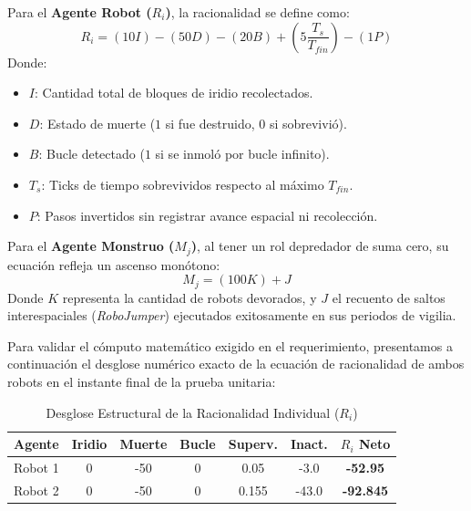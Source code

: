 \documentclass[conference]{IEEEtran}
\begin{document}
Para el \textbf{Agente Robot ($R_i$)}, la racionalidad se define como:
\begin{equation}
R_i = (10 I) - (50 D) - (20 B) + \left(5 \frac{T_s}{T_{fin}}\right) - (1 P)
\end{equation}
Donde:
\begin{itemize}
    \item $I$: Cantidad total de bloques de iridio recolectados.
    \item $D$: Estado de muerte ($1$ si fue destruido, $0$ si sobrevivió).
    \item $B$: Bucle detectado ($1$ si se inmoló por bucle infinito).
    \item $T_s$: Ticks de tiempo sobrevividos respecto al máximo $T_{fin}$.
    \item $P$: Pasos invertidos sin registrar avance espacial ni recolección.
\end{itemize}

Para el \textbf{Agente Monstruo ($M_j$)}, al tener un rol depredador de suma cero, su ecuación refleja un ascenso monótono:
\begin{equation}
M_j = (100 K) + J
\end{equation}
Donde $K$ representa la cantidad de robots devorados, y $J$ el recuento de saltos interespaciales (\textit{RoboJumper}) ejecutados exitosamente en sus periodos de vigilia.

Para validar el cómputo matemático exigido en el requerimiento, presentamos a continuación el desglose numérico exacto de la ecuación de racionalidad de ambos robots en el instante final de la prueba unitaria:

\begin{table}[htbp]
\caption{Desglose Estructural de la Racionalidad Individual ($R_i$)}
\begin{center}
\begin{tabular}{|c|c|c|c|c|c|c|}
\hline
\textbf{Agente} & \textbf{Iridio} & \textbf{Muerte} & \textbf{Bucle} & \textbf{Superv.} & \textbf{Inact.} & \textbf{$R_i$ Neto} \\
\hline
Robot 1 & 0 & -50 & 0 & 0.05 & -3.0 & \textbf{-52.95} \\
Robot 2 & 0 & -50 & 0 & 0.155 & -43.0 & \textbf{-92.845} \\
\hline
\end{tabular}
\end{center}
\end{table}
\end{document}
